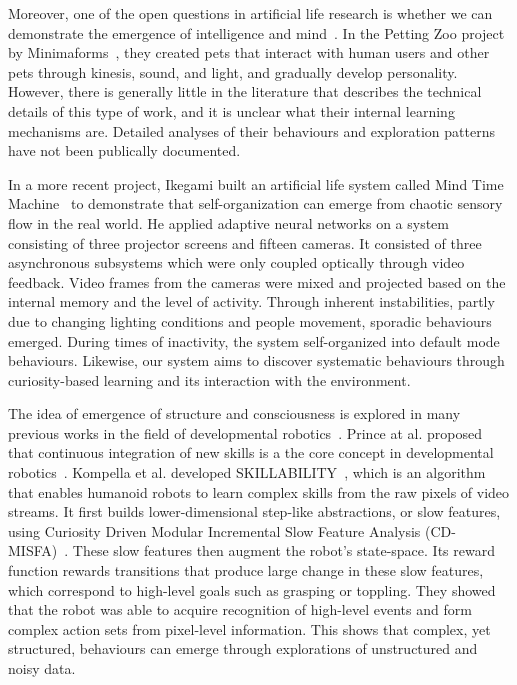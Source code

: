 Moreover, one of the open questions in artificial life research is whether we can demonstrate the emergence of intelligence and mind~\cite{Bedau2000}. In the Petting Zoo project by Minimaforms~\cite{Minimaforms}, they created pets that interact with human users and other pets through kinesis, sound, and light, and gradually develop personality. However, there is generally little in the literature that describes the technical details of this type of work, and it is unclear what their internal learning mechanisms are. Detailed analyses of their behaviours and exploration patterns have not been publically documented. 

In a more recent project, Ikegami built an artificial life system called Mind Time Machine~\cite{Ikegami2013} to demonstrate that self-organization can emerge from chaotic sensory flow in the real world. He applied adaptive neural networks on a system consisting of three projector screens and fifteen cameras. It consisted of three asynchronous subsystems which were only coupled optically through video feedback. Video frames from the cameras were mixed and projected based on the internal memory and the level of activity. Through inherent instabilities, partly due to changing lighting conditions and people movement, sporadic behaviours emerged. During times of inactivity, the system self-organized into default mode behaviours. Likewise, our system aims to discover systematic behaviours through curiosity-based learning and its interaction with the environment. 

The idea of emergence of structure and consciousness is explored in many previous works in the field of developmental robotics~\cite{Lungarella2003}\cite{Asada2009}. Prince at al. proposed that continuous integration of new skills is a the core concept in developmental robotics~\cite{Prince2005}. Kompella et al. developed SKILLABILITY~\cite{Kompella2014}, which is an algorithm that enables humanoid robots to learn complex skills from the raw pixels of video streams. It first builds lower-dimensional step-like abstractions, or slow features, using Curiosity Driven Modular Incremental Slow Feature Analysis (CD-MISFA)~\cite{Luciw2013}. These slow features then augment the robot's state-space. Its reward function rewards transitions that produce large change in these slow features, which correspond to high-level goals such as grasping or toppling. They showed that the robot was able to acquire recognition of high-level events and form complex action sets from pixel-level information. This shows that complex, yet structured, behaviours can emerge through explorations of unstructured and noisy data.

